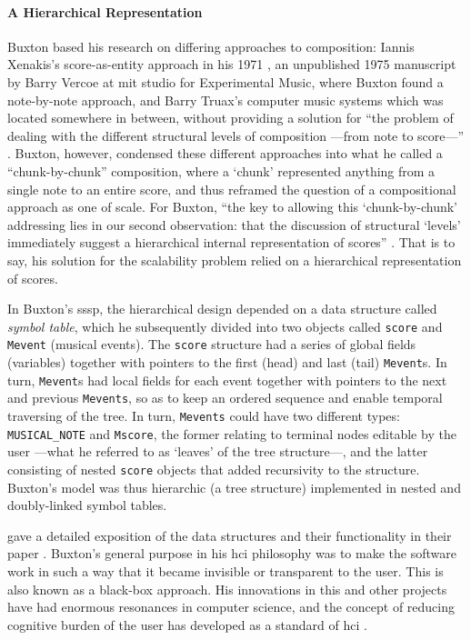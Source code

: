 	\paragraph{A Hierarchical Representation}
	Buxton based his research on differing approaches to composition: Iannis Xenakis's score-as-entity approach in his 1971  \parencite{Xen92:For}, an unpublished 1975 manuscript by Barry Vercoe at \gls{mit} studio for Experimental Music, where Buxton found a note-by-note approach, and Barry Truax's computer music systems \parencite{Tru73:The} which was located somewhere in between, without providing a solution for ``the problem of dealing with the different structural levels of composition ---from note to score---'' \parencite[120]{icmc/bbp2372.1978.012} . Buxton, however, condensed these different approaches into what he called a ``chunk-by-chunk'' composition, where a `chunk' represented anything from a single note to an entire score, and thus reframed the question of a compositional approach as one of scale. For Buxton, ``the key to allowing this `chunk-by-chunk' addressing lies in our second observation: that the discussion of structural `levels' immediately suggest a hierarchical internal representation of scores'' \parencite[120]{icmc/bbp2372.1978.012}. That is to say, his solution for the scalability problem relied on a hierarchical representation of scores. 

	In Buxton's \gls{sssp}, the hierarchical design depended on a data structure called \textit{symbol table}, which he subsequently divided into two objects called \texttt{score} and \texttt{Mevent} (musical events). The \texttt{score} structure had a series of global fields (variables) together with pointers to the first (head) and last (tail) \texttt{Mevent}s. In turn, \texttt{Mevent}s had local fields for each event together with pointers to the next and previous \texttt{Mevents}, so as to keep an ordered sequence  and enable temporal traversing of the tree. In turn, \texttt{Mevents} could have two different types: \texttt{MUSICAL\_NOTE} and \texttt{Mscore}, the former relating to terminal nodes editable by the user ---what he referred to as `leaves' of the tree structure---, and the latter consisting of nested \texttt{score} objects that added recursivity to the structure. Buxton's model was thus hierarchic (a tree structure) implemented in nested and doubly-linked symbol tables.

	\citeauthor{icmc/bbp2372.1978.012} gave a detailed exposition of the data structures and their functionality in their paper  \parencite{icmc/bbp2372.1978.012}. Buxton's general purpose in his \gls{hci} philosophy was to make the software work in such a way that it became invisible or transparent to the user. This is also known as a black-box approach. His innovations in this and other projects have had enormous resonances in computer science, and the concept of reducing cognitive burden of the user has developed as a standard of \gls{hci} \parencite{youtube/buxton16}.

